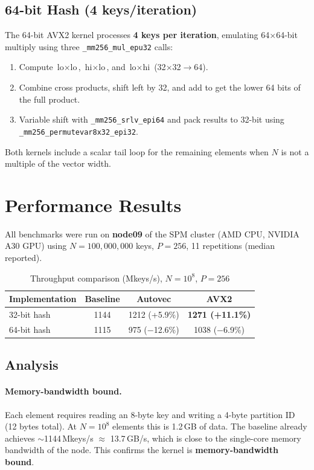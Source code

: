 \documentclass[11pt,a4paper]{article}
\begin{document}
\subsection{64-bit Hash (4 keys/iteration)}

The 64-bit AVX2 kernel processes \textbf{4 keys per iteration}, emulating 64$\times$64-bit multiply using three \texttt{\_mm256\_mul\_epu32} calls:
\begin{enumerate}
  \item Compute $\text{lo} \times \text{lo}$, $\text{hi} \times \text{lo}$, and $\text{lo} \times \text{hi}$ (32$\times$32$\to$64).
  \item Combine cross products, shift left by 32, and add to get the lower 64 bits of the full product.
  \item Variable shift with \texttt{\_mm256\_srlv\_epi64} and pack results to 32-bit using \texttt{\_mm256\_permutevar8x32\_epi32}.
\end{enumerate}

Both kernels include a scalar tail loop for the remaining elements when $N$ is not a multiple of the vector width.

\section{Performance Results}

All benchmarks were run on \textbf{node09} of the SPM cluster (AMD CPU, NVIDIA A30 GPU) using $N = 100{,}000{,}000$ keys, $P = 256$, 11 repetitions (median reported).

\begin{table}[h]
\centering
\caption{Throughput comparison (Mkeys/s), $N=10^8$, $P=256$}
\begin{tabular}{@{}lccc@{}}
\toprule
\textbf{Implementation} & \textbf{Baseline} & \textbf{Autovec} & \textbf{AVX2} \\
\midrule
32-bit hash & 1144 & 1212 (+5.9\%) & \textbf{1271 (+11.1\%)} \\
64-bit hash & 1115 & 975 ($-$12.6\%) & 1038 ($-$6.9\%) \\
\bottomrule
\end{tabular}
\label{tab:results}
\end{table}

\subsection{Analysis}

\paragraph{Memory-bandwidth bound.} Each element requires reading an 8-byte key and writing a 4-byte partition ID (12 bytes total). At $N = 10^8$ elements this is 1.2\,GB of data. The baseline already achieves $\sim$1144\,Mkeys/s $\approx$ 13.7\,GB/s, which is close to the single-core memory bandwidth of the node. This confirms the kernel is \textbf{memory-bandwidth bound}.
\end{document}
